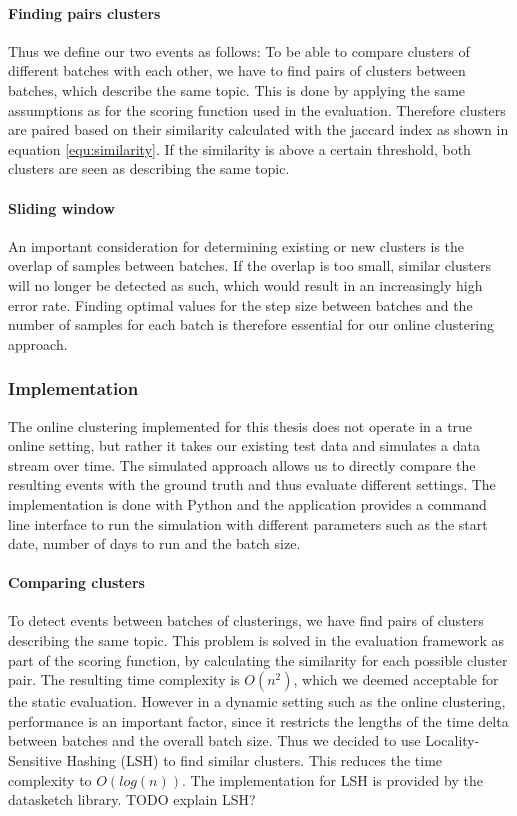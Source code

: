 \paragraph{Finding pairs clusters}
Thus we define our two events as follows:
To be able to compare clusters of different batches with each other, we have to find pairs of clusters between batches, which describe the same topic. This is done by applying the same assumptions as for the scoring function used in the evaluation. Therefore clusters are paired based on their similarity calculated with the jaccard index as shown in equation \ref{equ:similarity}. If the similarity is above a certain threshold, both clusters are seen as describing the same topic.

\paragraph{Sliding window}

An important consideration for determining existing or new clusters is the overlap of samples between batches. If the overlap is too small, similar clusters will no longer be detected as such, which would result in an increasingly high error rate. Finding optimal values for the step size between batches and the number of samples for each batch is therefore essential for our online clustering approach.

\subsubsection{Implementation}

The online clustering implemented for this thesis does not operate in a true online setting, but rather it takes our existing test data and simulates a data stream over time. The simulated approach allows us to directly compare the resulting events with the ground truth and thus evaluate different settings. The implementation is done with Python and the application provides a command line interface to run the simulation with different parameters such as the start date, number of days to run and the batch size.

\paragraph{Comparing clusters} To detect events between batches of clusterings, we have find pairs of clusters describing the same topic. This problem is solved in the evaluation framework as part of the scoring function, by calculating the similarity for each possible cluster pair. The resulting time complexity is $O(n^2)$, which we deemed acceptable for the static evaluation. However in a dynamic setting such as the online clustering, performance is an important factor, since it restricts the lengths of the time delta between batches and the overall batch size. Thus we decided to use Locality-Sensitive Hashing (LSH)\cite{alex2015practical} to find similar clusters. This reduces the time complexity to $O(log(n))$. The implementation for LSH is provided by the datasketch library\cite{eric_zhu_2017_290602}. TODO explain LSH?


